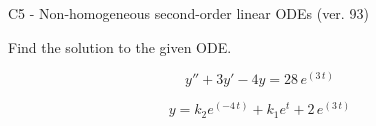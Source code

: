 \begin{exercise}
  \begin{exerciseTitle}C5 - Non-homogeneous second-order linear ODEs (ver. 93)\end{exerciseTitle}
  \begin{exerciseStatement}
    
Find the solution to the given ODE.

    
\[y''+3y'-4y = 28 \, e^{\left(3 \, t\right)}\]

  \end{exerciseStatement}
  \begin{exerciseAnswer}
    
\[y= k_{2} e^{\left(-4 \, t\right)} + k_{1} e^{t} + 2 \, e^{\left(3 \, t\right)}\]

  \end{exerciseAnswer}
\end{exercise}